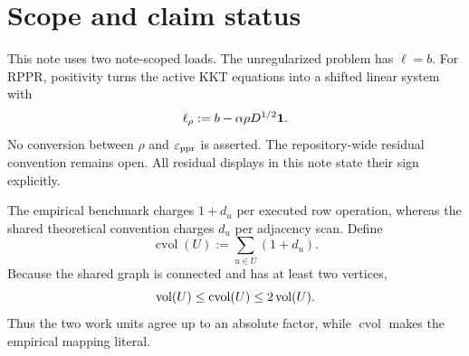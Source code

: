 \section{Scope and claim status}
\label{sec:scope}



This note uses two note-scoped loads.  The unregularized problem has
$\ell=b$.  For RPPR, positivity turns the active KKT equations into a shifted
linear system with
\begin{equation}
 \ell_\rho:=b-\alpha\rho D^{1/2}\mathbf{1}.
 \label{eq:shifted-load}
\end{equation}
No conversion between $\rho$ and $\varepsilon_{\mathrm{ppr}}$ is asserted.  The repository-wide
residual convention remains open.  All residual displays in this note state
their sign explicitly.

The empirical benchmark charges $1+d_u$ per executed row operation, whereas
the shared theoretical convention charges $d_u$ per adjacency scan.  Define
\begin{equation}
 \operatorname{cvol}(U):=\sum_{u\in U}(1+d_u).
 \label{eq:charged-volume}
\end{equation}
Because the shared graph is connected and has at least two vertices,
\begin{equation}
 \operatorname{vol}(U)\leq\operatorname{cvol}(U)\leq2\operatorname{vol}(U).
 \label{eq:charged-volume-equivalence}
\end{equation}
Thus the two work units agree up to an absolute factor, while
$\operatorname{cvol}$ makes the empirical mapping literal.

